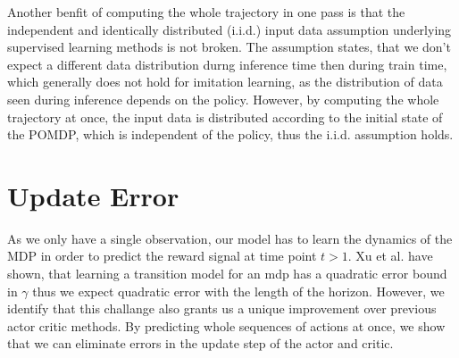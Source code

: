Another benfit of computing the whole trajectory in one pass is that the independent and identically distributed (i.i.d.) input data 
assumption underlying supervised learning methods is not broken. The assumption states, that we don't expect a different data distribution durng inference time 
then during train time, which generally does not hold for imitation learning, as the distribution of data seen during inference depends on the policy. 
However, by computing the whole trajectory at once, the input data is distributed according to the initial state of the POMDP, which is independent of 
the policy, thus the i.i.d. assumption holds.\\

\section{Update Error}
\label{inference_time_planning}
As we only have a single observation, our model has to learn the dynamics of the MDP in order to predict the reward signal at time point $t > 1$. Xu et al. \cite{NEURIPS2020_b5c01503} 
have shown, that learning a transition model for an mdp has a quadratic error bound in $\gamma$ thus we expect quadratic error with the length of the horizon. 
However, we identify that this challange also grants us a unique improvement over previous actor critic methods. By predicting whole sequences of actions at once, 
we show that we can eliminate errors in the update step of the actor and critic.\\

